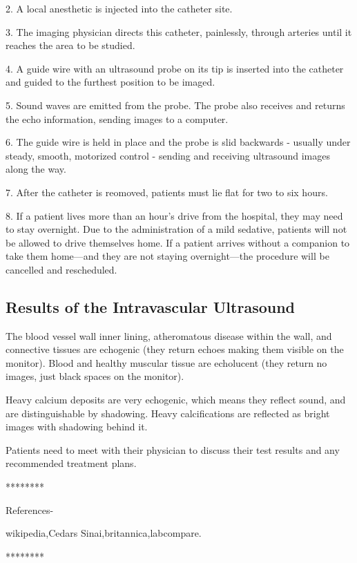 \documentclass[11pt]{article}
\begin{document}
2. A local anesthetic is injected into the catheter site.

3. The imaging physician directs this catheter, painlessly, through arteries until it reaches the area to be studied.

4. A guide wire with an ultrasound probe on its tip is inserted into the catheter and guided to the furthest position to be imaged.

5. Sound waves are emitted from the probe. The probe also receives and returns the echo information, sending images to a computer.

6. The guide wire is held in place and the probe is slid backwards - usually under steady, smooth, motorized control - sending and receiving ultrasound images along the way.

7. After the catheter is reomoved, patients must lie flat for two to six hours.

8. If a patient lives more than an hour's drive from the hospital, they may need to stay overnight. Due to the administration of a mild sedative, patients will not be allowed to drive themselves home. If a patient arrives without a companion to take them home—and they are not staying overnight—the procedure will be cancelled and rescheduled.
\subsection{Results of the Intravascular Ultrasound}
\raggedright The blood vessel wall inner lining, atheromatous disease within the wall, and connective tissues are echogenic (they return echoes making them visible on the monitor). Blood and healthy muscular tissue are echolucent (they return no images, just black spaces on the monitor).

Heavy calcium deposits are very echogenic, which means they reflect sound, and are distinguishable by shadowing. Heavy calcifications are reflected as bright images with shadowing behind it.

Patients need to meet with their physician to discuss their test results and any recommended treatment plans.

\setlength{\parskip}{5em}
            \centering
                ********

 \setlength{\parskip}{1em}
\huge \raggedright References-



\Large wikipedia,Cedars Sinai,britannica,labcompare.

\setlength{\parskip}{6em}
            \centering
                ********
\end{document}

